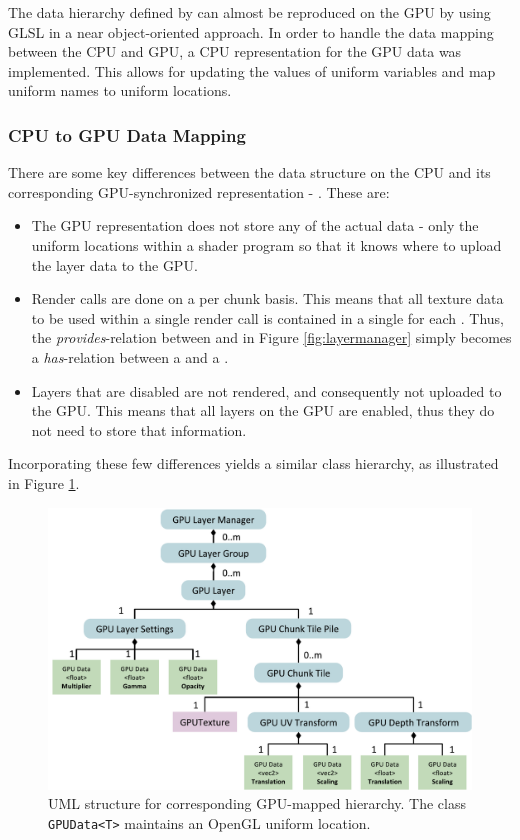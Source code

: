 The data hierarchy defined by  can almost be reproduced on the GPU by using GLSL in a near object-oriented approach. In order to handle the data mapping between the CPU and GPU, a CPU representation for the GPU data was implemented. This allows for updating the values of uniform variables and map uniform names to uniform locations.

\subsubsection{CPU to GPU Data Mapping}

There are some key differences between the  data structure on the CPU and its corresponding GPU-synchronized representation - . These are:

\begin{itemize}
\item The GPU representation does not store any of the actual  data - only the uniform locations within a shader program so that it knows where to upload the layer data to the GPU. 
\item Render calls are done on a per chunk basis. This means that all texture data to be used within a single render call is contained in a single  for each . Thus, the \emph{provides}-relation between  and  in Figure \ref{fig:layermanager} simply becomes a \emph{has}-relation between a  and a .
\item Layers that are disabled are not rendered, and consequently not uploaded to the GPU. This means that all layers on the GPU are enabled, thus they do not need to store that information.
\end{itemize}

Incorporating these few differences yields a similar class hierarchy, as illustrated in Figure \ref{fig:gpulayermanager}. 

\begin{figure}[htbp]
    \centering
    \includegraphics[width=\textwidth]{figures/implementation/layers/gpulayermanager.pdf}
    \caption{UML structure for corresponding GPU-mapped hierarchy. The class \texttt{GPUData<T>} maintains an OpenGL uniform location.}
    \label{fig:gpulayermanager}
\end{figure}

